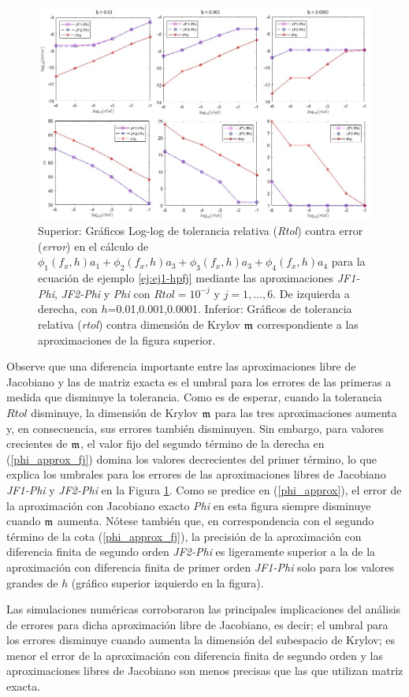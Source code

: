 \begin{figure}[htb]
	\includegraphics[scale=0.57]{Graphics/kpfj-brusselator-em.jpg}
	\caption{Superior: Gráficos Log-log de tolerancia relativa (\textit{Rtol}) contra error (\textit{error}) en el cálculo de $\phi _{1}(f_x,h)a_{1}+\phi _{2}(f_x,h)a_{3}+\phi _{3}(f_x,h)a_{3}+\phi _{4}(f_x,h)a_{4}$ para la ecuación de ejemplo \ref{ej:ej1-hpfj} mediante las aproximaciones \textit{JF1-Phi}, \textit{JF2-Phi} y \textit{Phi} con $Rtol=10^{-j}$ y $j=1,\ldots,6$. De izquierda a derecha, con $h$=0.01,0.001,0.0001. Inferior: Gráficos de tolerancia relativa (\textit{rtol}) contra dimensión de Krylov $\mathfrak{m}$ correspondiente a las aproximaciones de la figura superior.}
	\label{fig:SumPhiBrusselator}
\end{figure}

Observe que una diferencia importante entre las aproximaciones libre de Jacobiano y las de matriz exacta es el umbral para los errores de las primeras a medida que disminuye la tolerancia. Como es de esperar, cuando la tolerancia $Rtol$ disminuye, la dimensión de Krylov $\mathfrak{m}$ para las tres aproximaciones aumenta y, en consecuencia, sus errores también disminuyen. Sin embargo, para valores crecientes de $\mathfrak{m}$, el valor fijo del segundo término de la derecha en (\ref{phi_approx_fj}) domina los valores decrecientes del primer término, lo que explica los umbrales para los errores de las aproximaciones libres de Jacobiano \textit{JF1-Phi} y \textit{JF2-Phi} en la Figura \ref{fig:SumPhiBrusselator}. Como se predice en (\ref{phi_approx}), el error de la aproximación con Jacobiano exacto \textit{Phi} en esta figura siempre disminuye cuando $\mathfrak{m}$ aumenta. Nótese también que, en correspondencia con el segundo término de la cota (\ref{phi_approx_fj}), la precisión de la aproximación con diferencia finita de segundo orden \textit{JF2-Phi} es ligeramente superior a la de la aproximación con diferencia finita de primer orden \textit{JF1-Phi} solo para los valores grandes de $h$ (gráfico superior izquierdo en la figura).

Las simulaciones numéricas corroboraron las principales implicaciones del análisis de errores para dicha aproximación libre de Jacobiano, es decir; el umbral para los errores disminuye cuando aumenta la dimensión del subespacio de Krylov; es menor el error de la aproximación con diferencia finita de segundo orden y  las aproximaciones libres de Jacobiano son menos precisas que las que utilizan matriz exacta.